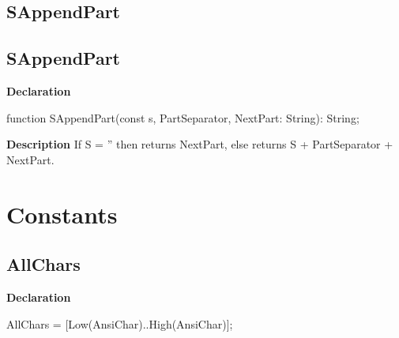 \documentclass{report}
\newif\ifpdf
\begin{document}
\subsection*{\large{\textbf{SAppendPart}}\normalsize\hspace{1ex}\hrulefill}
\else
\subsection*{SAppendPart}
\fi
\label{PasDoc_Utils-SAppendPart}
\begin{list}{}{
\setlength{\itemindent}{0cm}
\setlength{\listparindent}{0cm}
\setlength{\leftmargin}{\evensidemargin}
\addtolength{\leftmargin}{\tmplength}
\settowidth{\labelsep}{X}
\addtolength{\leftmargin}{\labelsep}
\setlength{\labelwidth}{\tmplength}
}
\item[\textbf{Declaration}\hfill]
\ifpdf
\begin{flushleft}
\fi
\begin{ttfamily}
function SAppendPart(const s, PartSeparator, NextPart: String): String;\end{ttfamily}

\ifpdf
\end{flushleft}
\fi

\par
\item[\textbf{Description}]
If S = '' then returns NextPart, else returns S + PartSeparator + NextPart.

\end{list}
\section{Constants}
\ifpdf
\subsection*{\large{\textbf{AllChars}}\normalsize\hspace{1ex}\hrulefill}
\else
\subsection*{AllChars}
\fi
\label{PasDoc_Utils-AllChars}
\begin{list}{}{
\setlength{\itemindent}{0cm}
\setlength{\listparindent}{0cm}
\setlength{\leftmargin}{\evensidemargin}
\addtolength{\leftmargin}{\tmplength}
\settowidth{\labelsep}{X}
\addtolength{\leftmargin}{\labelsep}
\setlength{\labelwidth}{\tmplength}
}
\item[\textbf{Declaration}\hfill]
\ifpdf
\begin{flushleft}
\fi
\begin{ttfamily}
AllChars = [Low(AnsiChar)..High(AnsiChar)];\end{ttfamily}

\ifpdf
\end{flushleft}
\fi

\end{list}
\ifpdf
\end{document}
